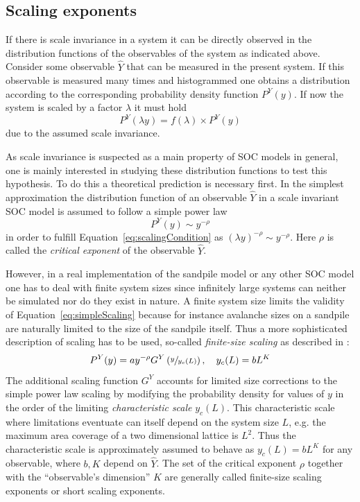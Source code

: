 \subsection{Scaling exponents}
\label{sec:th:scaling}
If there is scale invariance in a system it can be directly observed in the distribution functions
of the observables of the system as indicated above. Consider some observable $\hat{Y}$ that can be measured in the
present system. If this observable is measured many times and histogrammed one obtains a distribution according to the
corresponding probability density function $P^{Y}(y)$.
If now the system is scaled by a factor $\lambda$ it must hold
\begin{equation}\label{eq:scalingCondition}
P^{Y}(\lambda y) = f(\lambda) \times P^{Y}(y)
\end{equation}
due to the assumed scale invariance.

As scale invariance is suspected as a main property of SOC models in general, one is mainly interested in studying
these distribution functions to test this hypothesis. To do this a theoretical prediction is necessary first.
In the simplest approximation the distribution function of an observable $\hat{Y}$ in a scale invariant SOC model
is assumed to follow a simple power law
\begin{equation}\label{eq:simpleScaling}
P^{Y}(y) \sim y^{-\rho}
\end{equation}
in order to fulfill Equation~\eqref{eq:scalingCondition} as $(\lambda y)^{-\rho}\sim y^{-\rho}$.
Here $\rho$ is called the \emph{critical exponent} of the observable $\hat{Y}$.

However, in a real implementation of the sandpile model or any other SOC model one has to deal with finite system sizes
since infinitely large systems can neither be simulated nor do they exist in nature.
A finite system size limits the validity of Equation~\eqref{eq:simpleScaling} because for instance avalanche sizes on a
sandpile are naturally limited to the size of the sandpile itself. Thus a more sophisticated description of scaling
has to be used, so-called \emph{finite-size scaling} as described in \cite{SOC-book}:
\begin{equation}\label{eq:finiteSizeScaling}
P^{Y}(y) = a y^{-\rho} G^{Y}\left(\sfrac{y}{y_c(L)}\right), \quad y_c(L)=b L^K
\end{equation}
The additional scaling function $G^{Y}$ accounts for limited size corrections to the simple power law scaling
by modifying the probability density for values of $y$ in the order of the limiting \emph{characteristic scale}
$y_c(L)$. This characteristic scale where limitations eventuate can itself depend on the system size $L$,
e.g. the maximum area coverage of a two dimensional lattice is $L^2$. Thus the characteristic scale is approximately
assumed to behave as $y_c(L)=b L^K$ for any observable, where $b,K$ depend on $\hat{Y}$.
The set of the critical exponent $\rho$ together with the \enquote{observable's dimension} $K$ are
generally called finite-size scaling exponents or short scaling exponents.

